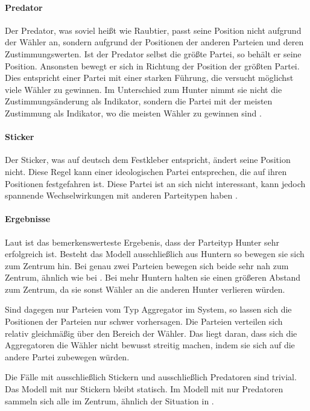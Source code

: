 \paragraph{Predator} Der Predator, was soviel heißt wie Raubtier, passt seine Position nicht aufgrund der Wähler an, sondern aufgrund der Positionen der anderen Parteien und deren Zustimmungswerten. Ist der Predator selbst die größte Partei, so behält er seine Position. Ansonsten bewegt er sich in Richtung der Position der größten Partei. Dies entspricht einer Partei mit einer starken Führung, die versucht möglichst viele Wähler zu gewinnen. Im Unterschied zum Hunter nimmt sie nicht die Zustimmungsänderung als Indikator, sondern die Partei mit der meisten Zustimmung als Indikator, wo die meisten Wähler zu gewinnen sind \citep[S.\,267]{laver2005policy}.

\paragraph{Sticker} Der Sticker, was auf deutsch dem Festkleber entspricht, ändert seine Position nicht. Diese Regel kann einer ideologischen Partei entsprechen, die auf ihren Positionen festgefahren ist. Diese Partei ist an sich nicht interessant, kann jedoch spannende Wechselwirkungen mit anderen Parteitypen haben \citep[S.\,267]{laver2005policy}.

\paragraph{Ergebnisse}
Laut \citet{laver2005policy} ist das bemerkenswerteste Ergebenis, dass der Parteityp Hunter sehr erfolgreich ist. Besteht das Modell ausschließlich aus Huntern so bewegen sie sich zum Zentrum hin. Bei genau zwei Parteien bewegen sich beide sehr nah zum Zentrum, ähnlich wie bei \citet{hotelling1929}. Bei mehr Huntern halten sie einen größeren Abstand zum Zentrum, da sie sonst Wähler an die anderen Hunter verlieren würden. \citep[S.\,267-70]{laver2005policy}

Sind dagegen nur Parteien vom Typ Aggregator im System, so lassen sich die Positionen der Parteien nur schwer vorhersagen. Die Parteien verteilen sich relativ gleichmäßig über den Bereich der Wähler. Das liegt daran, dass sich die Aggregatoren die Wähler nicht bewusst streitig machen, indem sie sich auf die andere Partei zubewegen würden. \citep[S.\,270-1]{laver2005policy}

Die Fälle mit ausschließlich Stickern und ausschließlich Predatoren sind trivial. Das Modell mit nur Stickern bleibt statisch. Im Modell mit nur Predatoren sammeln sich alle im Zentrum, ähnlich der Situation in \citet{hotelling1929}.

